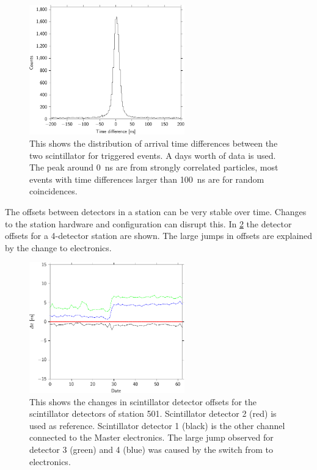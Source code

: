 \begin{figure}
    \centering
    \includegraphics[width=0.6\textwidth]
                    {plots/station/detector_time_difference_distribution}
    \caption{This shows the distribution of arrival time differences between the two scintillator for triggered events. A days worth of data is used. The peak around \SI{0}{\ns} are from strongly correlated particles, most events with time differences larger than \SI{100}{\ns} are for random coincidences.}
    \label{fig:detector_time_difference_distribution}
\end{figure}

The offsets between detectors in a station can be very stable over time. Changes to the station hardware and configuration can disrupt this. In \cref{fig:detector_offset_drift_month_501} the detector offsets for a 4-detector station are shown. The large jumps in offsets are explained by the change to \hisparciii electronics.

\begin{figure}
    \centering
    \includegraphics[width=0.6\textwidth]
                    {plots/station/detector_offset_drift_month_501}
    \caption{This shows the changes in scintillator detector offsets for the scintillator detectors of station 501. Scintillator detector 2 (red) is used as reference. Scintillator detector 1 (black) is the other channel connected to the Master electronics. The large jump observed for detector 3 (green) and 4 (blue) was caused by the switch from \hisparcii to \hisparciii electronics.}
    \label{fig:detector_offset_drift_month_501}
\end{figure}

